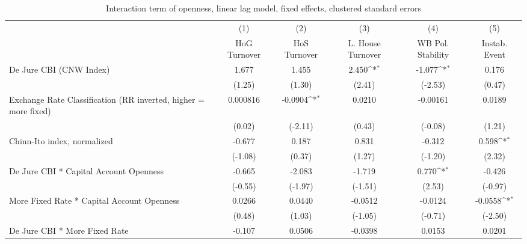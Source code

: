 {
\def\sym#1{\ifmmode^{#1}\else\(^{#1}\)\fi}
\begin{longtable}{l*{5}{c}}
\caption{Interaction term of openness, linear lag model, fixed effects, clustered standard errors \label{kapintlagsDJ}}\\
\hline\hline\endfirsthead\hline\endhead\hline\endfoot\endlastfoot
                &\multicolumn{1}{c}{(1)}&\multicolumn{1}{c}{(2)}&\multicolumn{1}{c}{(3)}&\multicolumn{1}{c}{(4)}&\multicolumn{1}{c}{(5)}\\
                &\multicolumn{1}{c}{HoG Turnover}&\multicolumn{1}{c}{HoS Turnover}&\multicolumn{1}{c}{L. House Turnover}&\multicolumn{1}{c}{WB Pol. Stability}&\multicolumn{1}{c}{Instab. Event}\\
\hline
De Jure CBI (CNW Index)&    1.677         &    1.455         &    2.450\sym{*}  &   -1.077\sym{*}  &    0.176         \\
                &   (1.25)         &   (1.30)         &   (2.41)         &  (-2.53)         &   (0.47)         \\
[1em]
Exchange Rate Classification (RR inverted, higher = more fixed)& 0.000816         &  -0.0904\sym{*}  &   0.0210         & -0.00161         &   0.0189         \\
                &   (0.02)         &  (-2.11)         &   (0.43)         &  (-0.08)         &   (1.21)         \\
[1em]
Chinn-Ito index, normalized&   -0.677         &    0.187         &    0.831         &   -0.312         &    0.598\sym{*}  \\
                &  (-1.08)         &   (0.37)         &   (1.27)         &  (-1.20)         &   (2.32)         \\
[1em]
De Jure CBI * Capital Account Openness&   -0.665         &   -2.083         &   -1.719         &    0.770\sym{*}  &   -0.426         \\
                &  (-0.55)         &  (-1.97)         &  (-1.51)         &   (2.53)         &  (-0.97)         \\
[1em]
More Fixed Rate * Capital Account Openness&   0.0266         &   0.0440         &  -0.0512         &  -0.0124         &  -0.0558\sym{*}  \\
                &   (0.48)         &   (1.03)         &  (-1.05)         &  (-0.71)         &  (-2.50)         \\
[1em]
De Jure CBI * More Fixed Rate&   -0.107         &   0.0506         &  -0.0398         &   0.0153         &   0.0201         \\

\end{longtable}}
